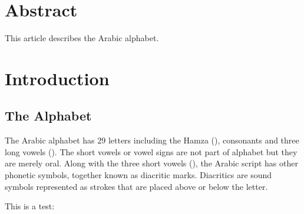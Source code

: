 \documentclass{jlcl}
\title{\articletitle}
\author{AUTHOR NAME\\
AUTHOR INSTITUTION\\
\texttt{AUTHOR EMAIL} \and
AUTHOR 2 NAME\\
AUTHOR 2 INSTITUTION\\
 \texttt{AUTHOR 2 EMAIL}}
\begin{document}
\setcounter{page}{1}
\thispagestyle{firstpage}

\authordata



\section*{Abstract}
This article describes the Arabic alphabet.



\section{Introduction}

\subsection{The Alphabet}

The Arabic alphabet has 29 letters including the Hamza (), consonants and three long vowels ().
The short vowels or vowel signs are not part of alphabet but they are merely oral.
Along with the three short vowels (), the Arabic script has other phonetic symbols, together known as diacritic marks.
Diacritics are sound symbols represented as strokes that are placed above or below the letter.

This is a test: 



\nocite{*}

{\small }
\end{document}
